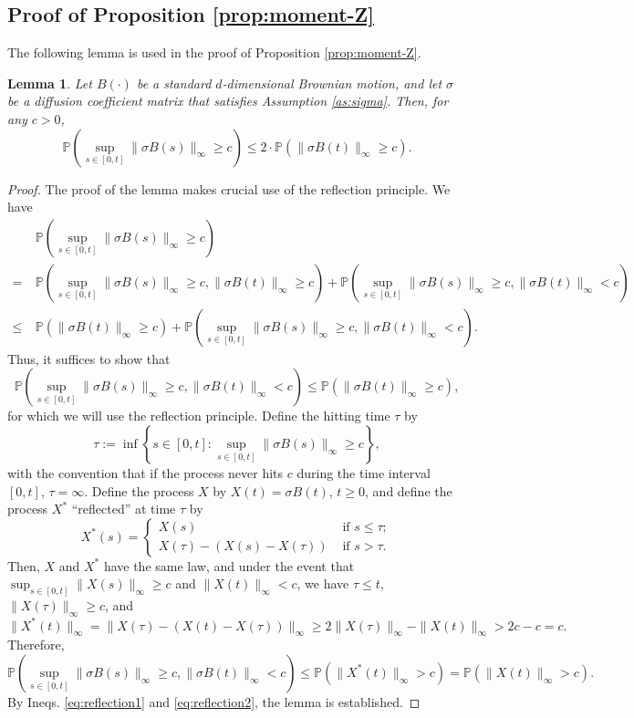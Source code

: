 \documentclass[11pt]{article}
\theoremstyle{definition}
\theoremstyle{plain}
\newtheorem{lemma}[assumption]{Lemma}
\newcommand{\pr}{\mathbb{P}}
\begin{document}
\begin{appendices}
\subsection{Proof of Proposition \ref{prop:moment-Z}}
The following lemma is used in the proof of Proposition \ref{prop:moment-Z}.
\begin{lemma}\label{lem:sigmaB}
Let $B(\cdot)$ be a standard $d$-dimensional Brownian motion, and let $\sigma$ be a diffusion coefficient matrix 
that satisfies Assumption \ref{as:sigma}. Then, for any $c > 0$, 
\begin{equation}\label{eq:sigmaB-reflection}
\pr\left(\sup_{s\in [0,t]} \|\sigma B(s)\|_\infty \geq c \right) \leq 2\cdot \pr\left(\|\sigma B(t)\|_\infty \geq c\right).
\end{equation}
\end{lemma}
\begin{proof}
The proof of the lemma makes crucial use of the reflection principle. We have 
\begin{align}
&~\pr\left(\sup_{s\in [0,t]} \|\sigma B(s)\|_\infty \geq c \right) \nonumber\\
=&~\pr\left(\sup_{s\in [0,t]} \|\sigma B(s)\|_\infty \geq c, \|\sigma B(t)\|_\infty \geq c \right) 
+ \pr\left(\sup_{s\in [0,t]} \|\sigma B(s)\|_\infty \geq c, \|\sigma B(t)\|_\infty < c \right) \nonumber \\
\leq &~\pr\left(\|\sigma B(t)\|_\infty \geq c \right) + \pr\left(\sup_{s\in [0,t]} \|\sigma B(s)\|_\infty \geq c, \|\sigma B(t)\|_\infty < c \right). 
\label{eq:reflection1}
\end{align}
Thus, it suffices to show that 
\[
\pr\left(\sup_{s\in [0,t]} \|\sigma B(s)\|_\infty \geq c, \|\sigma B(t)\|_\infty < c \right) \leq \pr\left(\|\sigma B(t)\|_\infty \geq c \right), 
\]
for which we will use the reflection principle. Define the hitting time $\tau$ by 
\[
\tau := \inf \left\{s \in [0, t] : \sup_{s\in [0,t]} \|\sigma B(s)\|_\infty \geq c\right\}, 
\]
with the convention that if the process never hits $c$ during the time interval $[0, t]$, $\tau = \infty$. 
Define the process $X$ by $X(t) = \sigma B(t)$, $t \geq 0$, and define the process $X^*$ ``reflected'' at time $\tau$ by
\[
X^*(s) = \left\{\begin{array}{ll}
X(s) & \text{ if } s\leq \tau; \\
X(\tau) - (X(s)-X(\tau)) & \text{ if } s > \tau.
\end{array}\right.
\]
Then, $X$ and $X^*$ have the same law, and under the event that $\sup_{s\in [0,t]} \|X(s)\|_\infty \geq c$ and $\|X(t)\|_\infty < c$, 
we have $\tau \leq t$, $\|X(\tau)\|_\infty \geq c$, and 
\[
\|X^*(t)\|_\infty = \|X(\tau) - (X(t)-X(\tau))\|_\infty \geq 2\|X(\tau)\|_\infty - \|X(t)\|_\infty > 2c-c = c.
\]
Therefore, 
\begin{equation}\label{eq:reflection2}
\pr\left(\sup_{s\in [0,t]} \|\sigma B(s)\|_\infty \geq c, \|\sigma B(t)\|_\infty < c \right) 
\leq \pr\left(\|X^*(t)\|_\infty > c \right) = \pr\left(\|X(t)\|_\infty > c \right).
\end{equation}
By Ineqs. \eqref{eq:reflection1} and \eqref{eq:reflection2}, the lemma is established.
\end{proof}


\end{appendices}
\end{document}
